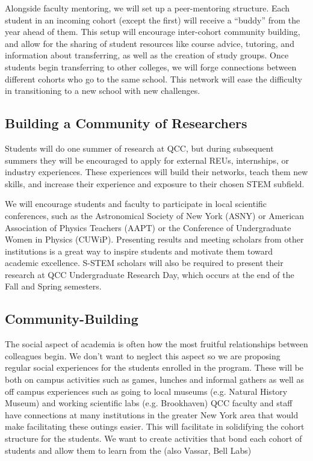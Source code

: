 \documentclass[12pt]{article}
\begin{document}
Alongside faculty mentoring, we will set up a peer-mentoring structure.  Each student in an incoming cohort (except the first) will receive a ``buddy'' from the year ahead of them.  This setup will encourage inter-cohort community building, and allow for the sharing of student resources like course advice, tutoring, and  information about transferring, as well as the creation of study groups.  Once students begin transferring to other colleges, we will forge connections between different cohorts who go to the same school.  This network will ease the difficulty in transitioning to a new school with new challenges.  

\subsection{Building a Community of Researchers}

Students will do one summer of research at QCC, but during subsequent summers they will be encouraged to apply for external REUs, internships, or industry experiences.  These experiences will build their networks, teach them new skills, and  increase their experience and exposure to their chosen STEM subfield.  

We will encourage students and faculty to participate in local scientific conferences, such as the Astronomical Society of New York (ASNY) or American Association of Physics Teachers (AAPT) or the Conference of Undergraduate Women in Physics (CUWiP).  Presenting results and meeting scholars from other institutions is a great way to inspire students and motivate them toward academic excellence.  S-STEM scholars will also be required to present their research at QCC Undergraduate Research Day, which occurs at the end of the Fall and Spring semesters.



\subsection{Community-Building}
The social aspect of academia is often how the most fruitful relationships between colleagues begin.  We don't want to neglect this aspect so we are proposing regular social experiences for the students enrolled in the program.  These will be both on campus activities such as games, lunches and informal gathers as well as off campus experiences such as going to local museums (e.g. Natural History Museum) and working scientific labs (e.g. Brookhaven) QCC faculty and staff have connections at many institutions in the greater New York area that would make facilitating these outings easier.  This will facilitate in solidifying the cohort structure for the students.  We want to create activities that bond each cohort of students and allow them to learn from the   (also Vassar, Bell Labs)
\end{document}
